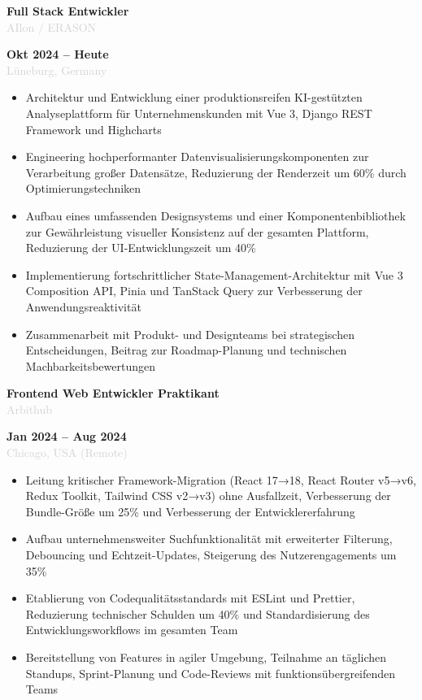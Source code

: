 \documentclass[10pt,a4paper]{article}
\newcommand{\Experience}[4]{%
  \vspace{2pt}
  \noindent
  \begin{minipage}[t]{0.70\textwidth}
    {\normalsize\textbf{\color{darkgray}#3}} \\
    \textcolor{lightgray}{\small #1}
  \end{minipage}%
  \hfill
  \begin{minipage}[t]{0.28\textwidth}
    \raggedleft
    \textcolor{mediumgray}{\small\textbf{#4}} \\
    \textcolor{lightgray}{\small #2}
  \end{minipage}
  \vspace{1pt}
}
\begin{document}
\Experience{AIlon / ERASON}{Lüneburg, Germany}{Full Stack Entwickler}{Okt 2024 -- Heute}
\begin{itemize}
  \item Architektur und Entwicklung einer produktionsreifen KI-gestützten Analyseplattform für Unternehmenskunden mit Vue 3, Django REST Framework und Highcharts
  \item Engineering hochperformanter Datenvisualisierungskomponenten zur Verarbeitung großer Datensätze, Reduzierung der Renderzeit um 60\% durch Optimierungstechniken
  \item Aufbau eines umfassenden Designsystems und einer Komponentenbibliothek zur Gewährleistung visueller Konsistenz auf der gesamten Plattform, Reduzierung der UI-Entwicklungszeit um 40\%
  \item Implementierung fortschrittlicher State-Management-Architektur mit Vue 3 Composition API, Pinia und TanStack Query zur Verbesserung der Anwendungsreaktivität
  \item Zusammenarbeit mit Produkt- und Designteams bei strategischen Entscheidungen, Beitrag zur Roadmap-Planung und technischen Machbarkeitsbewertungen
\end{itemize}

\Experience{Arbithub}{Chicago, USA (Remote)}{Frontend Web Entwickler Praktikant}{Jan 2024 -- Aug 2024}
\begin{itemize}
  \item Leitung kritischer Framework-Migration (React 17→18, React Router v5→v6, Redux Toolkit, Tailwind CSS v2→v3) ohne Ausfallzeit, Verbesserung der Bundle-Größe um 25\% und Verbesserung der Entwicklererfahrung
  \item Aufbau unternehmensweiter Suchfunktionalität mit erweiterter Filterung, Debouncing und Echtzeit-Updates, Steigerung des Nutzerengagements um 35\%
  \item Etablierung von Codequalitätsstandards mit ESLint und Prettier, Reduzierung technischer Schulden um 40\% und Standardisierung des Entwicklungsworkflows im gesamten Team
  \item Bereitstellung von Features in agiler Umgebung, Teilnahme an täglichen Standups, Sprint-Planung und Code-Reviews mit funktionsübergreifenden Teams
\end{itemize}
\end{document}
